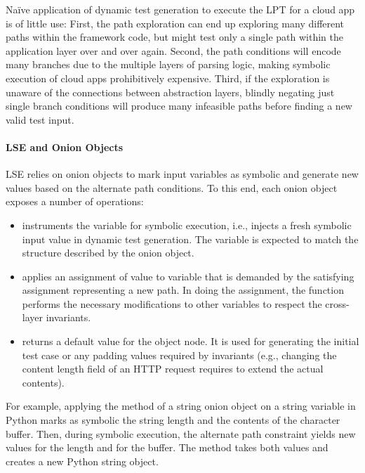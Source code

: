 Na\"ive application of dynamic test generation to execute the LPT for a cloud app is of little use: First, the path exploration can end up exploring many different paths within the framework code, but might test only a single path within the application layer over and over again. Second, the path conditions will encode many branches due to the multiple layers of parsing logic, making symbolic execution of cloud apps prohibitively expensive. Third, if the exploration is unaware of the connections between abstraction layers, blindly negating just single branch conditions will produce many infeasible paths before finding a new valid test input.

\paragraph{LSE and Onion Objects}

LSE relies on onion objects to mark input variables as symbolic and generate new values based on the alternate path conditions.  To this end, each onion object exposes a number of operations:

\begin{itemize}
\item {} instruments the variable 
  for symbolic execution, i.e., injects a fresh symbolic input value
  in dynamic test generation.  The variable is expected to match the
  structure described by the onion object.
%
\item {} applies an assignment of value  to variable  that is demanded by the satisfying assignment representing a new path. In doing the assignment, the function performs the necessary modifications to other variables to respect the cross-layer invariants.
%
\item {} returns a default value for the object node. It is used for generating the initial test case or any padding values required by invariants (e.g., changing the content length field of an HTTP request requires to extend the actual contents).
\end{itemize}

For example, applying the  method of a string onion object on a string variable in Python marks as symbolic the string length and the contents of the character buffer.  Then, during symbolic execution, the alternate path constraint yields new values for the length and for the buffer.  The  method takes both values and creates a new Python string object.

